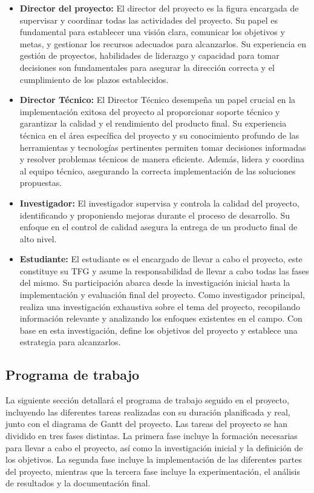 \begin{itemize}
    \item \textbf{Director del proyecto:} El director del proyecto es la figura
    encargada de supervisar y coordinar todas las actividades del proyecto. Su papel 
    es fundamental para establecer una visión clara, comunicar los objetivos y metas, 
    y gestionar los recursos adecuados para alcanzarlos. Su experiencia en gestión de 
    proyectos, habilidades de liderazgo y capacidad para tomar decisiones son 
    fundamentales para asegurar la dirección correcta y el cumplimiento de los plazos 
    establecidos.
    \item \textbf{Director Técnico:} El Director Técnico desempeña un papel crucial 
    en la implementación exitosa del proyecto al proporcionar soporte técnico y 
    garantizar la calidad y el rendimiento del producto final. Su experiencia 
    técnica en el área específica del proyecto y su conocimiento profundo de las 
    herramientas y tecnologías pertinentes permiten tomar decisiones informadas 
    y resolver problemas técnicos de manera eficiente. Además, lidera y coordina al 
    equipo técnico, asegurando la correcta implementación de las soluciones propuestas.
    \item \textbf{Investigador:} El investigador supervisa y controla la calidad del 
    proyecto, identificando y proponiendo mejoras durante el proceso de desarrollo. Su 
    enfoque en el control de calidad asegura la entrega de un producto final de alto nivel.
    \item \textbf{Estudiante:} El estudiante es el encargado de llevar a cabo el proyecto,
    este constituye su TFG y asume la responsabilidad de llevar a cabo todas las fases del 
    mismo. Su participación abarca desde la investigación inicial hasta la implementación 
    y evaluación final del proyecto. Como investigador principal, realiza una investigación 
    exhaustiva sobre el tema del proyecto, recopilando información relevante y analizando 
    los enfoques existentes en el campo. Con base en esta investigación, define los objetivos 
    del proyecto y establece una estrategia para alcanzarlos.
\end{itemize}

\subsection{Programa de trabajo}
La siguiente sección detallará el programa de trabajo seguido en el proyecto, incluyendo 
las diferentes tareas realizadas con su duración planificada y real, junto con el diagrama 
de Gantt del proyecto. Las tareas del proyecto se han dividido en tres fases distintas. 
La primera fase incluye la formación necesarias para llevar a cabo el proyecto, así como
la investigación inicial y la definición de los objetivos. La segunda fase incluye la
implementación de las diferentes partes del proyecto, mientras que la tercera fase incluye
la experimentación, el análisis de resultados y la documentación final.

